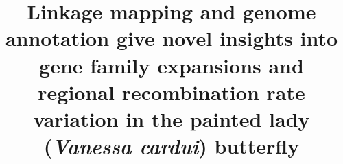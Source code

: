 \documentclass[twocolumn]{bmcart}%
\begin{document}
\begin{frontmatter}

\begin{fmbox}


\title{
{
 Linkage mapping and genome annotation give novel insights into gene family expansions and regional recombination rate variation in the painted 
lady ({\it Vanessa cardui}) butterfly
}
}


\author[
  addressref={aff1,aff2}, 
   noteref={n1},%
  email={daria.shipilina@ebc.uu.se}   %
]{ }
\author[
  addressref={aff1},
  noteref={n1},
  email={karin.nasvall@ebc.uu.se}
]{ }
\author[
  addressref={aff1},
  email={lars.hook@ebc.uu.se}
]{ }
\author[
  addressref={aff3},
  email={roger.vila@csic.es}
]{ }
\author[
  addressref={aff4},
  email={gerard.talavera@csic.es}
]{ }
\author[
  addressref={aff1},
  email={niclas.backstrom@ebc.uu.se}
]{ }




\end{fmbox}
\end{frontmatter}
\end{document}
